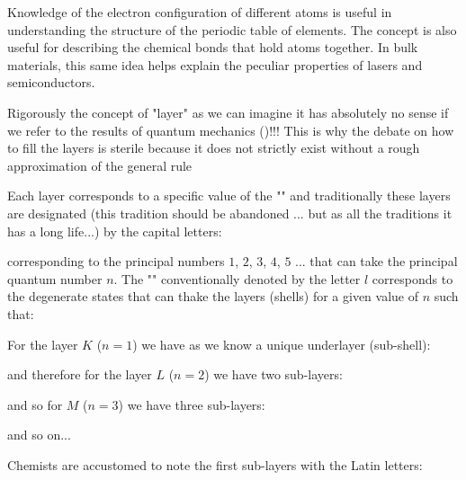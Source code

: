 	Knowledge of the electron configuration of different atoms is useful in understanding the structure of the periodic table of elements. The concept is also useful for describing the chemical bonds that hold atoms together. In bulk materials, this same idea helps explain the peculiar properties of lasers and semiconductors.
	
	\begin{tcolorbox}[title=Remark,colframe=black,arc=10pt]
		Rigorously the concept of "layer" as we can imagine it has absolutely no sense if we refer to the results of quantum mechanics ()!!! This is why the debate on how to fill the layers is sterile because it does not strictly exist without a rough approximation of the general rule
	\end{tcolorbox}
	Each layer corresponds to a specific value of the "" and traditionally these layers are designated (this tradition should be abandoned ... but as all the traditions it has a long life...) by the capital letters:
	
	corresponding to the principal numbers $1$, $2$, $3$, $4$, $5$ ... that can take the principal quantum number $n$.
	The "" conventionally denoted by the letter $l$ corresponds to the degenerate states that can thake the layers (shells) for a given value of $n$ such that:

	For the layer $K$ ($n=1$) we have as we know a unique underlayer (sub-shell):
	
	and therefore for the layer $L$ ($n=2$) we have two sub-layers:
	
	and so for $M$ ($n=3$) we have three sub-layers:
	
	and so on...

	Chemists are accustomed to note the first sub-layers with the Latin letters:
	
